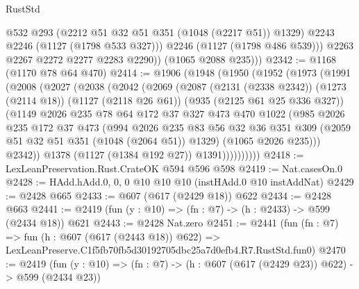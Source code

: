 \begin{lexlean}{RustStd}
\begin{coremodule}
                @532
                @293
                (@2212 @51 @32 @51 @351 (@1048 (@2217 @51)) @1329)
                @2243
                @2246
                (@1127 (@1798 @533 @327)))
              @2246
              (@1127 (@1798 @486 @539)))
            @2263
            @2267
            @2272
            @2277
            @2283
            @2290))
        (@1065 @2088 @235)))
@2342 := @1168 (@1170 @78 @64 @470)
@2414 := @1906
    (@1948
      (@1950
        (@1952
          (@1973
            (@1991
              (@2008
                (@2027
                  (@2038
                    (@2042
                      (@2069
                        (@2087
                          (@2131 (@2338 @2342))
                          (@1273 (@2114 @18))
                          (@1127 (@2118 @26 @61))
                          (@935 (@2125 @61 @25 @336 @327))
                          (@1149
                            @2026
                            @235
                            @78
                            @64
                            @172
                            @37
                            @327
                            @473
                            @470
                            @1022
                            (@985
                              @2026
                              @235
                              @172
                              @37
                              @473
                              (@994
                                @2026
                                @235
                                @83
                                @56
                                @32
                                @36
                                @351
                                @309
                                (@2059 @51 @32 @51 @351 (@1048 (@2064 @51)) @1329)
                                (@1065 @2026 @235)))
                            @2342))
                        @1378
                        (@1127 (@1384 @192 @27))
                        @1391))))))))))
@2418 := LexLeanPreservation.Rust.CrateOK @594 @596 @598
@2419 := Nat.casesOn.{0}
@2428 := HAdd.hAdd.{0, 0, 0} @10 @10 @10 (instHAdd.{0} @10 instAddNat)
@2429 := @2428 @665
@2433 := @607 (@617 (@2429 @18)) @622
@2434 := @2428 @663
@2441 := @2419 (fun (y : @10) => (fn : @7) -> (h : @2433) -> @599 (@2434 @18)) @621
@2443 := @2428 Nat.zero
@2451 := @2441
    (fun (fn : @7) =>
    fun (h : @607 (@617 (@2443 @18)) @622) =>
    LexLeanPreserve.C1f5fb70fb5d30192705dbc25a7d0efb4.R7.RustStd.fun0)
@2470 := @2419
    (fun (y : @10) => (fn : @7) -> (h : @607 (@617 (@2429 @23)) @622) -> @599 (@2434 @23))

\end{coremodule}
\end{lexlean}
